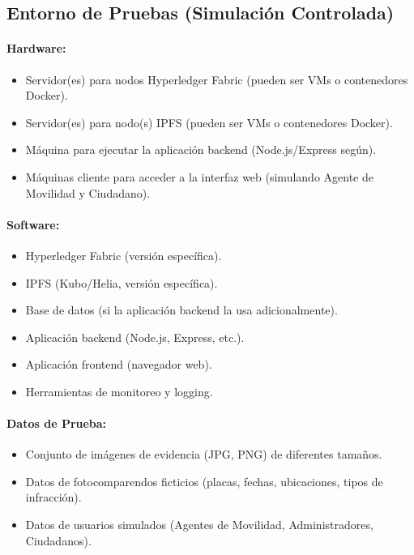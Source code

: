 \subsection{Entorno de Pruebas (Simulación Controlada)}
\paragraph{Hardware:}
\begin{itemize}
    \item Servidor(es) para nodos Hyperledger Fabric (pueden ser VMs o contenedores Docker). 
    \item Servidor(es) para nodo(s) IPFS (pueden ser VMs o contenedores Docker). 
    \item Máquina para ejecutar la aplicación backend (Node.js/Express según). 
    \item Máquinas cliente para acceder a la interfaz web (simulando Agente de Movilidad y Ciudadano).
\end{itemize}
\paragraph{Software:}
\begin{itemize}
    \item Hyperledger Fabric (versión específica). 
    \item IPFS (Kubo/Helia, versión específica).
    \item Base de datos (si la aplicación backend la usa adicionalmente). 
    \item Aplicación backend (Node.js, Express, etc.).
        \item Aplicación frontend (navegador web). 
    \item Herramientas de monitoreo y logging.
\end{itemize}
\paragraph{Datos de Prueba:}
\begin{itemize}
    \item Conjunto de imágenes de evidencia (JPG, PNG) de diferentes tamaños. 
    \item Datos de fotocomparendos ficticios (placas, fechas, ubicaciones, tipos de infracción). 
    \item Datos de usuarios simulados (Agentes de Movilidad, Administradores, Ciudadanos).
\end{itemize}

